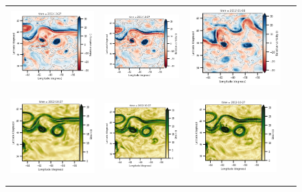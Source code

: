 \begin{figure}[ht!]
\begin{center}
\begin{tabular}{cccc}
\includegraphics[trim={13mm 13mm 21.2mm 5mm},clip, width=3.2cm,height=3cm]{content/figures/fourdvarnet_figs/osse_gf_nadirswot_vort_r.png} &
\includegraphics[trim={13mm 13mm 21.2mm 5mm},clip, width=3.2cm,height=3cm]{content/figures/fourdvarnet_figs/osse_gf_nadir_sst_vort_r.png} &
\includegraphics[trim={13mm 13mm 0 5mm},clip,width=4.0cm,height=3cm]{content/figures/fourdvarnet_figs/ose_gf_vort_r.png} \\
\includegraphics[trim={0 0 19mm 5mm},clip, width=3.60cm,height=3.4cm]{content/figures/fourdvarnet_figs/osse_gf_nadir_strain.png} &
\includegraphics[trim={13mm 0 19mm 5mm},clip, width=3.2cm,height=3.4cm]{content/figures/fourdvarnet_figs/osse_gf_nadirswot_strain.png} &
\includegraphics[trim={13mm 0 19mm 5mm},clip, width=3.2cm,height=3.4cm]{content/figures/fourdvarnet_figs/osse_gf_nadir_sst_strain.png} &

\end{tabular}
\end{center}
\end{figure}
